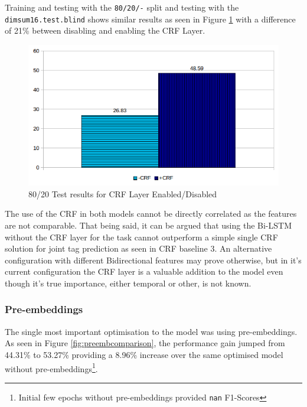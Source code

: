 Training and testing with the \texttt{80/20/-} split and testing with the \texttt{dimsum16.test.blind} shows similar results as seen in Figure \ref{fig:8020crflayerenabledisablebargraph} with a difference of 21\% between disabling and enabling the CRF Layer.

\begin{figure}[H]
  \includegraphics[width=\textwidth]{images/bi_lstm_crf_80_20_crf_comparison_test_bar_graph.png}
  \caption{80/20 Test results for CRF Layer Enabled/Disabled}
  \label{fig:8020crflayerenabledisablebargraph}
\end{figure}

The use of the CRF in both models cannot be directly correlated as the features are not comparable. That being said, it can be argued that using the Bi-LSTM without the CRF layer for the \dimsum task cannot outperform a simple single CRF solution for joint tag prediction as seen in CRF baseline 3. An alternative configuration with different Bidirectional features may prove otherwise, but in it's current configuration the CRF layer is a valuable addition to the model even though it's true importance, either temporal or other, is not known. 

\subsubsection{Pre-embeddings}

The single most important optimisation to the model was using pre-embeddings. As seen in Figure \ref{fig:preembcomparison}, the performance gain jumped from 44.31\% to 53.27\% providing a 8.96\% increase over the same optimised model without pre-embeddings\footnote{Initial few epochs without pre-embeddings provided \texttt{nan} F1-Scores}.

